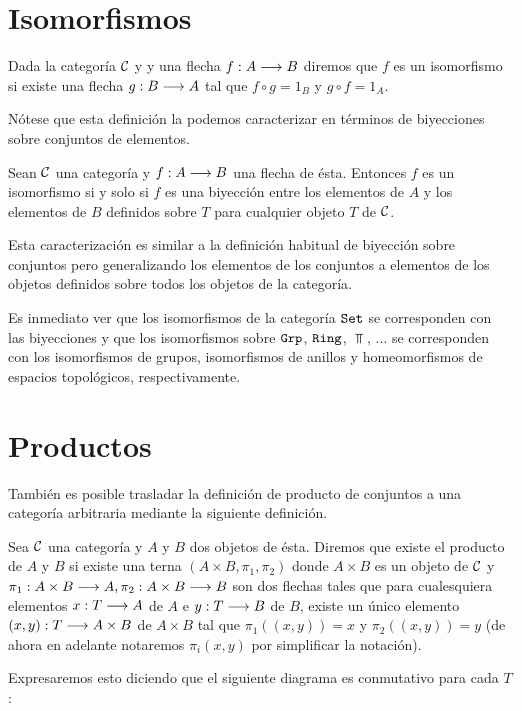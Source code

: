 \section{Isomorfismos}
\begin{definition}
Dada la categoría $\mathcal{C}$ y y una flecha $f: A\longrightarrow B$ diremos que
$f$ es un isomorfismo si existe una flecha $g: B\longrightarrow A$
tal que $f \circ g = 1_B$ y $g \circ f = 1_A$.
\end{definition}
Nótese que esta definición la podemos caracterizar en términos
de biyecciones sobre conjuntos de elementos.
\begin{proposition}
Sean $\mathcal{C}$ una categoría y $f: A\longrightarrow B$ una flecha de ésta.
Entonces $f$ es un isomorfismo si y solo si $f$ es una biyección entre
los elementos de $A$ y los elementos de $B$ definidos sobre $T$
para cualquier objeto $T$ de $\mathcal{C}$.
\end{proposition}
Esta caracterización es similar a la definición habitual
de biyección sobre conjuntos pero generalizando los elementos de
los conjuntos a elementos de los objetos definidos sobre todos
los objetos
de la categoría.

Es inmediato ver
que los isomorfismos de la categoría $\texttt{Set}$ se corresponden con las
biyecciones y que los isomorfismos sobre $\texttt{Grp}$, $\texttt{Ring}$, $\Top$, ...
se corresponden con los isomorfismos de grupos,
isomorfismos de anillos y homeomorfismos de espacios topológicos,
respectivamente.

\section{Productos}
También es posible trasladar la definición de producto de conjuntos
a una categoría arbitraria mediante la siguiente definición.

\begin{definition}
Sea $\mathcal{C}$ una categoría y $A$ y $B$ dos objetos de ésta. Diremos que
existe el producto de $A$ y $B$ si
existe una terna $(A\times B, \pi_1, \pi_2)$
donde $A\times B$ es un objeto de $\mathcal{C}$ y
$\pi_1 : A\times B\longrightarrow A, \pi_2 : A\times B\longrightarrow B$ son dos flechas tales
que para cualesquiera elementos $x : T\longrightarrow A$ de $A$ e
$y: T\longrightarrow B$ de $B$, existe un único elemento
$(x,y): T\longrightarrow A\times B$ de $A\times B$ tal que $\pi_1 ((x,y))=x$ y $\pi_2((x,y))=y$ (de ahora en adelante notaremos $\pi_i(x, y)$ por
simplificar la notación).

Expresaremos esto diciendo que  el siguiente diagrama es conmutativo
para cada $T$:
\begin{center}
\end{center}

\end{definition}

